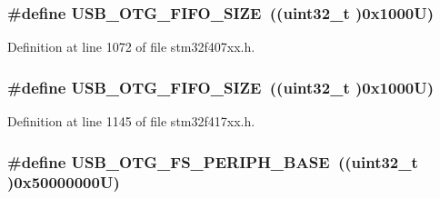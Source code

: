 \subsubsection[{\texorpdfstring{U\+S\+B\+\_\+\+O\+T\+G\+\_\+\+F\+I\+F\+O\+\_\+\+S\+I\+ZE}{USB_OTG_FIFO_SIZE}}]{\setlength{\rightskip}{0pt plus 5cm}\#define U\+S\+B\+\_\+\+O\+T\+G\+\_\+\+F\+I\+F\+O\+\_\+\+S\+I\+ZE~((uint32\+\_\+t )0x1000\+U)}\hypertarget{group___peripheral__registers__structures_ga8781c4b2406c740d9fe540737a6a0188}{}\label{group___peripheral__registers__structures_ga8781c4b2406c740d9fe540737a6a0188}


Definition at line 1072 of file stm32f407xx.\+h.

\subsubsection[{\texorpdfstring{U\+S\+B\+\_\+\+O\+T\+G\+\_\+\+F\+I\+F\+O\+\_\+\+S\+I\+ZE}{USB_OTG_FIFO_SIZE}}]{\setlength{\rightskip}{0pt plus 5cm}\#define U\+S\+B\+\_\+\+O\+T\+G\+\_\+\+F\+I\+F\+O\+\_\+\+S\+I\+ZE~((uint32\+\_\+t )0x1000\+U)}\hypertarget{group___peripheral__registers__structures_ga8781c4b2406c740d9fe540737a6a0188}{}\label{group___peripheral__registers__structures_ga8781c4b2406c740d9fe540737a6a0188}


Definition at line 1145 of file stm32f417xx.\+h.

\subsubsection[{\texorpdfstring{U\+S\+B\+\_\+\+O\+T\+G\+\_\+\+F\+S\+\_\+\+P\+E\+R\+I\+P\+H\+\_\+\+B\+A\+SE}{USB_OTG_FS_PERIPH_BASE}}]{\setlength{\rightskip}{0pt plus 5cm}\#define U\+S\+B\+\_\+\+O\+T\+G\+\_\+\+F\+S\+\_\+\+P\+E\+R\+I\+P\+H\+\_\+\+B\+A\+SE~((uint32\+\_\+t )0x50000000\+U)}\hypertarget{group___peripheral__registers__structures_gaa86d4c80849a74938924e73937b904e7}{}\label{group___peripheral__registers__structures_gaa86d4c80849a74938924e73937b904e7}


